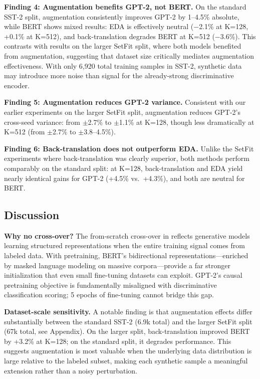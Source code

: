 \documentclass[11pt,a4paper,twocolumn]{article}
\begin{document}
\textbf{Finding 4: Augmentation benefits GPT-2, not BERT.} On the standard SST-2 split, augmentation consistently improves GPT-2 by 1--4.5\% absolute, while BERT shows mixed results: EDA is effectively neutral ($-$2.1\% at K=128, +0.1\% at K=512), and back-translation degrades BERT at K=512 ($-$3.6\%). This contrasts with results on the larger SetFit split, where both models benefited from augmentation, suggesting that dataset size critically mediates augmentation effectiveness. With only 6,920 total training samples in SST-2, synthetic data may introduce more noise than signal for the already-strong discriminative encoder.

\textbf{Finding 5: Augmentation reduces GPT-2 variance.} Consistent with our earlier experiments on the larger SetFit split, augmentation reduces GPT-2's cross-seed variance: from $\pm$2.7\% to $\pm$1.1\% at K=128, though less dramatically at K=512 (from $\pm$2.7\% to $\pm$3.8--4.5\%).

\textbf{Finding 6: Back-translation does not outperform EDA.} Unlike the SetFit experiments where back-translation was clearly superior, both methods perform comparably on the standard split: at K=128, back-translation and EDA yield nearly identical gains for GPT-2 (+4.5\% vs.\ +4.3\%), and both are neutral for BERT.

\subsection{Discussion}

\textbf{Why no cross-over?} The from-scratch cross-over in \cite{kasa2025} reflects generative models learning structured representations when the entire training signal comes from labeled data. With pretraining, BERT's bidirectional representations---enriched by masked language modeling on massive corpora---provide a far stronger initialization that even small fine-tuning datasets can exploit. GPT-2's causal pretraining objective is fundamentally misaligned with discriminative classification scoring; 5 epochs of fine-tuning cannot bridge this gap.

\textbf{Dataset-scale sensitivity.} A notable finding is that augmentation effects differ substantially between the standard SST-2 (6.9k total) and the larger SetFit split (67k total, see Appendix). On the larger split, back-translation improved BERT by +3.2\% at K=128; on the standard split, it degrades performance. This suggests augmentation is most valuable when the underlying data distribution is large relative to the labeled subset, making each synthetic sample a meaningful extension rather than a noisy perturbation.
\end{document}
